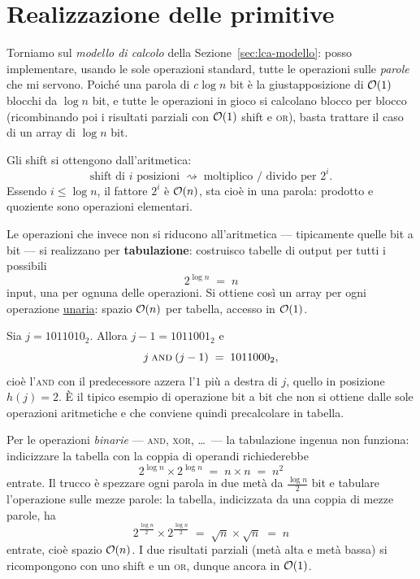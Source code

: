 \section{Realizzazione delle primitive}\label{sec:lca-primitive}

Torniamo sul \emph{modello di calcolo} della Sezione~\ref{sec:lca-modello}: posso
implementare, usando le sole operazioni standard, tutte le operazioni sulle
\emph{parole} che mi servono. Poiché una parola di $c\log n$ bit è la giustapposizione
di $\mathcal{O}(1)$ blocchi da $\log n$ bit, e tutte le operazioni in gioco si calcolano blocco
per blocco (ricombinando poi i risultati parziali con $\mathcal{O}(1)$ shift e \textsc{or}),
basta trattare il caso di un array di $\log n$ bit.

Gli shift si ottengono dall'aritmetica:
\[
  \text{shift di } i \text{ posizioni}
  \;\rightsquigarrow\;
  \text{moltiplico / divido per } 2^{i}.
\]
Essendo $i\le\log n$, il fattore $2^{i}$ è $\mathcal{O}(n)$, sta cioè in una parola: prodotto e
quoziente sono operazioni elementari.

Le operazioni che invece non si riducono all'aritmetica --- tipicamente quelle bit a
bit --- si realizzano per \textbf{tabulazione}: costruisco tabelle di output per tutti i
possibili
\[
  2^{\log n} \;=\; n
\]
input, una per ognuna delle operazioni. Si ottiene così un array per ogni operazione
\underline{unaria}: spazio $\mathcal{O}(n)$ per tabella, accesso in $\mathcal{O}(1)$.

\begin{esempio}
  Sia $j = 1011010_{2}$. Allora $j-1 = 1011001_{2}$ e
  \[
    j \mathbin{\textsc{and}} (j-1) \;=\; 1011000_{2},
  \]
  cioè l'\textsc{and} con il predecessore azzera l'$1$ più a destra di $j$, quello in
  posizione $h(j)=2$. È il tipico esempio di operazione bit a bit che non si ottiene
  dalle sole operazioni aritmetiche e che conviene quindi precalcolare in tabella.
\end{esempio}

Per le operazioni \emph{binarie} --- \textsc{and}, \textsc{xor}, \dots\ --- la
tabulazione ingenua non funziona: indicizzare la tabella con la coppia di operandi
richiederebbe
\[
  2^{\log n} \times 2^{\log n} \;=\; n \times n \;=\; n^{2}
\]
entrate. Il trucco è spezzare ogni parola in due metà da $\tfrac{\log n}{2}$ bit e
tabulare l'operazione sulle mezze parole: la tabella, indicizzata da una coppia di
mezze parole, ha
\[
  2^{\frac{\log n}{2}} \times 2^{\frac{\log n}{2}}
  \;=\; \sqrt{n}\times\sqrt{n} \;=\; n
\]
entrate, cioè spazio $\mathcal{O}(n)$. I due risultati parziali (metà alta e metà bassa) si
ricompongono con uno shift e un \textsc{or}, dunque ancora in $\mathcal{O}(1)$.

